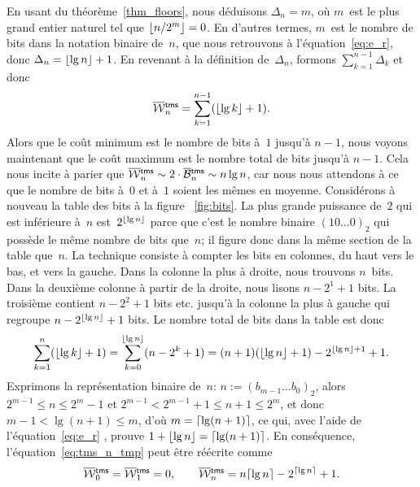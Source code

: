 En usant du théorème~\vref{thm_floors}, nous déduisons \(\Delta_n =
m\), où \(m\)~est le plus grand entier naturel tel que \(\lfloor{n/2^m}\rfloor
= 0\). En d'autres termes, \(m\)~est le nombre de bits dans la
notation binaire de~\(n\), que nous retrouvons à
l'équation~\eqref{eq:e_r}, donc \(\Delta_n = \lfloor{\lg n}\rfloor +
1\). En revenant à la définition de~\(\Delta_n\), formons
\(\sum_{k=1}^{n-1}\Delta_k\) et donc
\begin{equation}
\OW{\fun{tms}}{n} = \sum_{k=1}^{n-1}(\floor{\lg k}+1).
\label{eq:tms_n_tmp}
\end{equation}
Alors que le coût minimum est le nombre de bits à~\(1\) jusqu'à
\(n-1\), nous voyons maintenant que le coût maximum est le nombre
total de bits jusqu'à \(n-1\). Cela nous incite à parier que
\(\OW{\fun{tms}}{n} \sim 2 \cdot \OB{\fun{tms}}{n} \sim n\lg n\), car
nous nous attendons à ce que le nombre de bits à~\(0\) et à~\(1\)
soient les mêmes en moyenne. Considérons à nouveau la table des bits à
la figure \fig~\vref{fig:bits}. La plus grande puissance de~\(2\) qui
est inférieure à~\(n\) est~\(2^{\lfloor{\lg n}\rfloor}\) parce que c'est le
nombre binaire \((10\dots0)_2\) qui possède le même nombre de bits
que~\(n\); il figure donc dans la même section de la table
que~\(n\). La technique consiste à compter les bits en colonnes, du
haut vers le bas, et vers la gauche. Dans la colonne la plus à droite,
nous trouvons \(n\)~bits. Dans la deuxième colonne à partir de la
droite, nous lisons \(n-2^1+1\) bits. La troisième contient
\(n-2^2+1\) bits etc. jusqu'à la colonne la plus à gauche qui regroupe
\(n-2^{\lfloor{\lg n}\rfloor}+1\) bits. Le nombre total de bits dans la table
est donc
\begin{equation*}
\sum_{k=1}^{n}{\!(\lfloor{\lg k}\rfloor+1)}
   = \sum_{k=0}^{\lfloor{\lg n}\rfloor}{\!(n-2^k+1)}
   = (n + 1)(\lfloor{\lg n}\rfloor + 1) - 2^{\lfloor{\lg n}\rfloor+1} + 1.
\end{equation*}
Exprimons la représentation binaire de~\(n\): \(n := (b_{m-1}\dots
b_0)_2\), alors \(2^{m-1} \leqslant n \leqslant 2^m - 1\) et \(2^{m-1}
< 2^{m-1} + 1 \leqslant n + 1 \leqslant 2^m\), et donc \(m-1 < \lg(n+1)
\leqslant m\), d'où \(m = \lceil{\lg(n+1)}\rceil\), ce qui, avec l'aide de
l'équation~\eqref{eq:e_r} , prouve \(1 + \lfloor{\lg
  n}\rfloor = \lceil{\lg(n+1)}\rceil\). En conséquence,
l'équation~\eqref{eq:tms_n_tmp} peut être réécrite comme
\begin{equation}
\OW{\fun{tms}}{0} = \OW{\fun{tms}}{1} = 0,
\qquad
\OW{\fun{tms}}{n} = n\ceiling{\lg n} - 2^{\ceiling{\lg n}} + 1.
\label{eq:top}
\end{equation}
